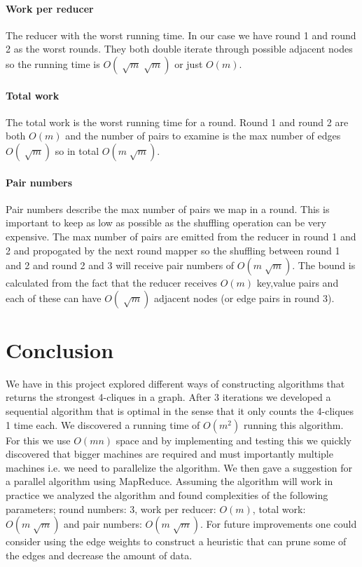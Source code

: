 \documentclass{article}
\begin{document}
\paragraph{Work per reducer}
The reducer with the worst running time. In our case we have round 1 and round 2 as the worst rounds. They both double iterate through possible adjacent nodes so the running time is $O(\sqrt[]{m}\sqrt[]{m})$ or just $O(m)$.

\paragraph{Total work}
The total work is the worst running time for a round. Round 1 and round 2 are both $O(m)$ and the number of pairs to examine is the max number of edges $O(\sqrt[]{m})$ so in total $O(m\sqrt[]{m})$.

\paragraph{Pair numbers}
Pair numbers describe the max number of pairs we map in a round. This is important to keep as low as possible as the shuffling operation can be very expensive. The max number of pairs are emitted from the reducer in round 1 and 2 and propogated by the next round mapper so the shuffling between round 1 and 2 and round 2 and 3 will receive pair numbers of $O(m\sqrt[]{m})$. The bound is calculated from the fact that the reducer receives $O(m)$ key,value pairs and each of these can have $O(\sqrt[]{m})$ adjacent nodes (or edge pairs in round 3).

\section{Conclusion}
We have in this project explored different ways of constructing algorithms that returns the strongest 4-cliques in a graph. After 3 iterations we developed a sequential algorithm that is optimal in the sense that it only counts the 4-cliques 1 time each. We discovered a running time of $O(m^{2})$ running this algorithm. For this we use $O(mn)$ space and by implementing and testing this we quickly discovered that bigger machines are required and must importantly multiple machines i.e. we need to parallelize the algorithm.
We then gave a suggestion for a parallel algorithm using MapReduce. Assuming the algorithm will work in practice we analyzed the algorithm and found complexities of the following parameters; round numbers: 3, work per reducer: $O(m)$, total work: $O(m\sqrt[]{m})$ and pair numbers: $O(m\sqrt[]{m})$.
For future improvements one could consider using the edge weights to construct a heuristic that can prune some of the edges and decrease the amount of data.
\end{document}
